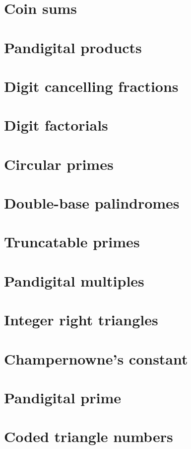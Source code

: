 \documentclass[11pt]{article}
\begin{document}
\section{Coin sums} 

\section{Pandigital products} 

\section{Digit cancelling fractions} 

\section{Digit factorials} 

\section{Circular primes} 

\section{Double-base palindromes} 

\section{Truncatable primes} 

\section{Pandigital multiples} 

\section{Integer right triangles} 

\section{Champernowne's constant} 

\section{Pandigital prime} 

\section{Coded triangle numbers} 
\end{document}
